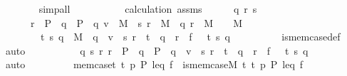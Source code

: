 \begin{isabellebody}
\ \ \ \ \ \ \isamarkupfalse%
\ simp{\isacharunderscore}{\kern0pt}all\isanewline
\ \ \ \ \isamarkupfalse%
\isanewline
\ \ \ \ \isamarkupfalse%
\ calculation\ assms\isanewline
\ \ \ \ \isamarkupfalse%
\ q\ r\ s\ \isanewline
\ \ \ \ \ \ {\isachardoublequoteopen}r\ {\isasymin}\ P\ {\isasymand}\ q\ {\isasymin}\ P\ {\isasymand}\ {\isasymlangle}q{\isacharcomma}{\kern0pt}\ v{\isasymrangle}\ {\isasymin}\ M\ {\isasymand}\ {\isasymlangle}s{\isacharcomma}{\kern0pt}\ r{\isasymrangle}\ {\isasymin}\ M\ {\isasymand}\ {\isasymlangle}q{\isacharcomma}{\kern0pt}\ r{\isasymrangle}\ {\isasymin}\ M\ {\isasymand}\ {}\ {\isasymin}\ M\ {\isasymand}\isanewline
\ \ \ \ \ \ \ {\isasymlangle}{}{\isacharcomma}{\kern0pt}\ t{}{\isacharcomma}{\kern0pt}\ s{\isacharcomma}{\kern0pt}\ q{\isasymrangle}\ {\isasymin}\ M\ {\isasymand}\ q\ {\isasympreceq}\ v\ {\isasymand}\ {\isasymlangle}s{\isacharcomma}{\kern0pt}\ r{\isasymrangle}\ {\isasymin}\ t{}\ {\isasymand}\ q\ {\isasympreceq}\ r\ {\isasymand}\ f\ {\isacharbackquote}{\kern0pt}\ {\isasymlangle}{}{\isacharcomma}{\kern0pt}\ t{}{\isacharcomma}{\kern0pt}\ s{\isacharcomma}{\kern0pt}\ q{\isasymrangle}\ {\isacharequal}{\kern0pt}\ {}{\isachardoublequoteclose}\isanewline
\ \ \ \ \ \ \isamarkupfalse%
\ is{\isacharunderscore}{\kern0pt}mem{\isacharunderscore}{\kern0pt}case{\isacharunderscore}{\kern0pt}def\ \isamarkupfalse%
\ auto\isanewline
\ \ \ \ \isamarkupfalse%
\isanewline
\ \ \ \ \isamarkupfalse%
\ {\isachardoublequoteopen}{\isasymexists}q\ s\ r{\isachardot}{\kern0pt}\ r\ {\isasymin}\ P\ {\isasymand}\ q\ {\isasymin}\ P\ {\isasymand}\ q\ {\isasympreceq}\ v\ {\isasymand}\ {\isasymlangle}s{\isacharcomma}{\kern0pt}\ r{\isasymrangle}\ {\isasymin}\ t{}\ {\isasymand}\ q\ {\isasympreceq}\ r\ {\isasymand}\ f\ {\isacharbackquote}{\kern0pt}\ {\isasymlangle}{}{\isacharcomma}{\kern0pt}\ t{}{\isacharcomma}{\kern0pt}\ s{\isacharcomma}{\kern0pt}\ q{\isasymrangle}\ {\isacharequal}{\kern0pt}\ {}{\isachardoublequoteclose}\isanewline
\ \ \ \ \ \ \isamarkupfalse%
\ auto\isanewline
\ \ \isacommand{{\isacharbraceright}{\kern0pt}}\isamarkupfalse%
\isanewline
\ \ \isamarkupfalse%
\isanewline
\ \ \isamarkupfalse%
\ {\isachardoublequoteopen}mem{\isacharunderscore}{\kern0pt}case{\isacharparenleft}{\kern0pt}t{}{\isacharcomma}{\kern0pt}\ t{}{\isacharcomma}{\kern0pt}\ p{\isacharcomma}{\kern0pt}\ P{\isacharcomma}{\kern0pt}\ leq{\isacharcomma}{\kern0pt}\ f{\isacharparenright}{\kern0pt}{\isachardoublequoteclose}\ \ {\isachardoublequoteopen}is{\isacharunderscore}{\kern0pt}mem{\isacharunderscore}{\kern0pt}case{\isacharparenleft}{\kern0pt}{\isacharhash}{\kern0pt}{\isacharhash}{\kern0pt}M{\isacharcomma}{\kern0pt}\ t{}{\isacharcomma}{\kern0pt}\ t{}{\isacharcomma}{\kern0pt}\ p{\isacharcomma}{\kern0pt}\ P{\isacharcomma}{\kern0pt}\ leq{\isacharcomma}{\kern0pt}\ f{\isacharparenright}{\kern0pt}{\isachardoublequoteclose}\isanewline

\end{isabellebody}
